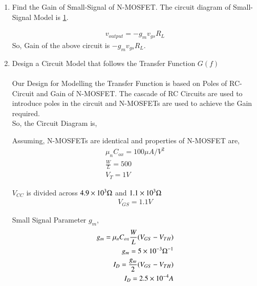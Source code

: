 \begin{enumerate}[label=\thesubsection.\arabic*.,ref=\thesubsection.\theenumi]
\item Find the Gain of Small-Signal of N-MOSFET. The circuit diagram of Small-Signal Model is \ref{fig:N-MOS Circuit}.
\begin{figure}[ht!]
	\begin{center}
		\resizebox{\columnwidth/2}{!}{}
	\end{center}
	\caption{}
	\label{fig:N-MOS Circuit}
\end{figure}

\solution
\begin{align}
v_{output} = -g_{m}v_{gs}R_{L}
\end{align}
So, Gain of the above circuit is $-g_{m}v_{gs}R_{L}$.\\

\item Design a Circuit Model that follows the Transfer Function $G(f)$\\
\solution\\
Our Design for Modelling the Transfer Function is based on Poles of RC-Circuit and Gain of N-MOSFET.
The cascade of RC Circuits are used to introduce poles in the circuit and N-MOSFETs are used to achieve the Gain required.\\

So, the Circuit Diagram is,
\begin{figure}[ht!]
	\begin{center}
		\resizebox{\columnwidth/1}{!}{}
	\end{center}
	\caption{}
	\label{fig:Circuit}
\end{figure}
 
Assuming, N-MOSFETs are identical and properties of N-MOSFET are,
\begin{align}
\mu_{n}C_{ox} = 100 \mu A/V^{2}\\
\frac{W}{L} = 500\\
V_{T} = 1 V
\end{align}

$V_{CC}$ is divided across $4.9\times 10^{3} \ohm$ and $1.1\times 10^{3} \ohm$
\begin{align}
V_{GS} = 1.1V
\end{align}

Small Signal Parameter $g_{m}$,
\begin{align}
g_{m} = \mu_{n}C_{ox}\frac{W}{L}(V_{GS} - V_{TH})\\
g_{m} = 5\times 10^{-3} \ohm^{-1} \\
I_{D} = \frac{g_{m}}{2} (V_{GS} - V_{TH})\\
I_{D} = 2.5\times 10^{-4} A
\end{align}


\end{enumerate}
